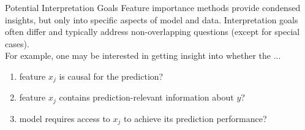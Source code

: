 \documentclass[10pt,compress,t,notes=noshow, xcolor=table]{beamer}
\begin{document}
\begin{framev}[align=top]{Potential Interpretation Goals}
Feature importance methods provide condensed insights, but only into specific aspects of model and data.
Interpretation goals often differ and typically address non-overlapping questions (except for special cases). \\
\spacer[0.5]
For example, one may be interested in getting insight into whether the ...
\begin{enumerate}
\item[(1)] feature $x_j$ is causal for the prediction?
\item[(2)] feature $x_j$ contains prediction-relevant information about $y$?
\item[(3)] model requires access to $x_j$ to achieve its prediction performance?
\end{enumerate}
\end{framev}
\end{document}
